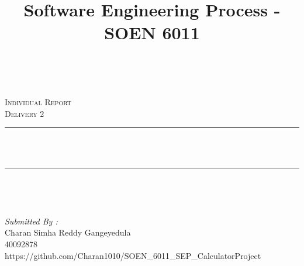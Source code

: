 \documentclass[12pt]{report}
\title{Software Engineering Process - SOEN 6011}
\author{ }
\date{}
\makeatletter
\let\thetitle\@title
\makeatother
\begin{document}

\begin{titlepage}
	\centering
    \vspace*{0.5 cm}
   
\begin{center}    \textsc{\Large   }\\[2.0 cm]	\end{center}

	\textsc{\Large Individual Report  }\\[0.5 cm]
	\textsc{\Large Delivery 2  }\\[0.5 cm]%
	\rule{\linewidth}{0.2 mm} \\[0.4 cm]
	{ \huge \bfseries \thetitle}\\
	\rule{\linewidth}{0.2 mm} \\[1.5 cm]
	
	\begin{minipage}{0.4\textwidth}
		\begin{center} \large
			\end{center}
			\end{minipage}~
			\begin{center}{}
            
			\begin{center} \large
			\emph{Submitted By :} \\
			Charan Simha Reddy Gangeyedula  \\
			40092878 \\
		 https://github.com/Charan1010/SOEN\_6011\_SEP\_CalculatorProject\\
			
		\end{center}
           
	\end{center}\\[2 cm]
	

    
    
    
    
	
\end{titlepage}

\end{document}
